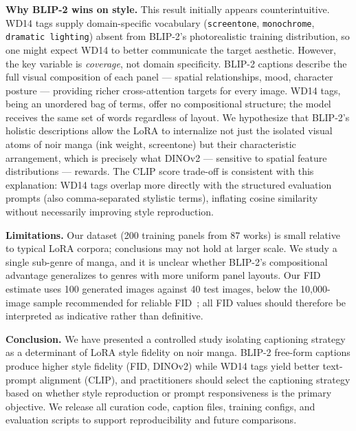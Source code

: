 \documentclass[10pt,twocolumn,letterpaper]{article}
\begin{document}
\noindent\textbf{Why BLIP-2 wins on style.}
This result initially appears counterintuitive.
WD14 tags supply domain-specific vocabulary (\texttt{screentone}, \texttt{monochrome}, \texttt{dramatic lighting}) absent from BLIP-2's photorealistic training distribution, so one might expect WD14 to better communicate the target aesthetic.
However, the key variable is \emph{coverage}, not domain specificity.
BLIP-2 captions describe the full visual composition of each panel — spatial relationships, mood, character posture — providing richer cross-attention targets for every image.
WD14 tags, being an unordered bag of terms, offer no compositional structure; the model receives the same set of words regardless of layout.
We hypothesize that BLIP-2's holistic descriptions allow the LoRA to internalize not just the isolated visual atoms of noir manga (ink weight, screentone) but their characteristic arrangement, which is precisely what DINOv2 — sensitive to spatial feature distributions — rewards.
The CLIP score trade-off is consistent with this explanation: WD14 tags overlap more directly with the structured evaluation prompts (also comma-separated stylistic terms), inflating cosine similarity without necessarily improving style reproduction.

\noindent\textbf{Limitations.}
Our dataset (200 training panels from 87 works) is small relative to typical LoRA corpora; conclusions may not hold at larger scale.
We study a single sub-genre of manga, and it is unclear whether BLIP-2's compositional advantage generalizes to genres with more uniform panel layouts.
Our FID estimate uses 100 generated images against 40 test images, below the 10,000-image sample recommended for reliable FID~\cite{heusel2017fid}; all FID values should therefore be interpreted as indicative rather than definitive.

\noindent\textbf{Conclusion.}
We have presented a controlled study isolating captioning strategy as a determinant of LoRA style fidelity on noir manga.
BLIP-2 free-form captions produce higher style fidelity (FID, DINOv2) while WD14 tags yield better text-prompt alignment (CLIP), and practitioners should select the captioning strategy based on whether style reproduction or prompt responsiveness is the primary objective.
We release all curation code, caption files, training configs, and evaluation scripts to support reproducibility and future comparisons.

{\small


}
\end{document}
